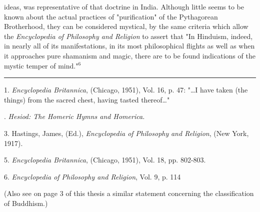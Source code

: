 ideas, was representative of that doctrine in India. Although
little seems to be known about the actual practices
of "purification" of the Pythagorean Brotherhood, they can
be considered mystical, by the same criteria which allow
the \textit{Encyclopedia of Philosophy and Religion} to assert that
"In Hinduism, indeed, in nearly all of its manifestations,
in its most philosophical flights as well as when it
approaches pure shamanism and magic, there are to be found
indications of the mystic temper of mind."$^{6}$\par
\vspace*{\fill}
\noindent\rule{0.25\textwidth}{0.4pt}\par
1. \textit{Encyclopedia Britannica}, (Chicago, 1951), Vol. 16, p. 47:
"\dots I have taken (the things) from the sacred chest, having
tasted thereof\dots"\par
[2, 4]. \textit{\textit{Hesiod: The Homeric Hymns and Homerica}.}\par
3. Hastings, James, (Ed.), \textit{Encyclopedia of Philosophy}
\textit{and Religion}, (New York, 1917).\par
5. \textit{Encyclopedia Britannica}, (Chicago, 1951), Vol. 18,
pp. 802-803.\par
6. \textit{Encyclopedia of Philosophy and Religion}, Vol. 9, p. 114\par
(Also see on page 3 of this thesis a similar statement concerning
the classification of Buddhism.)\par

\newpage

{}

